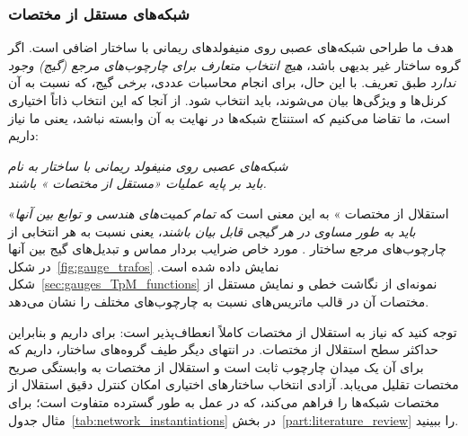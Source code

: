 

\subsubsection{شبکه‌های مستقل از مختصات }
هدف ما
طراحی شبکه‌های عصبی روی منیفولدهای ریمانی با ساختار اضافی  است.
اگر گروه ساختار  غیر بدیهی باشد، \emph{هیچ انتخاب متعارف برای چارچوب‌های مرجع (گیج) وجود ندارد} طبق تعریف.
با این حال، برای انجام محاسبات عددی، \emph{برخی} گیج، که نسبت به آن کرنل‌ها و ویژگی‌ها بیان می‌شوند، باید انتخاب شود.
از آنجا که این انتخاب ذاتاً اختیاری است، ما تقاضا می‌کنیم که استنتاج شبکه‌ها در نهایت به آن وابسته نباشد، یعنی ما نیاز داریم:
\begin{center}\it
	شبکه‌های عصبی روی منیفولد ریمانی با ساختار  به نام \lr{$\GM$} \\
	باید بر پایه عملیات «مستقل از مختصات \lr{$\GM$}» باشند.
\end{center}
«استقلال از مختصات \lr{$\GM$}» به این معنی است که \emph{تمام کمیت‌های هندسی و توابع بین آنها باید به طور مساوی در هر گیجی قابل بیان باشند}، یعنی نسبت به هر انتخابی از چارچوب‌های مرجع ساختار .
مورد خاص ضرایب بردار مماس و تبدیل‌های گیج بین آنها در شکل~\ref{fig:gauge_trafos} نمایش داده شده است.
شکل~\ref{sec:gauges_TpM_functions} نمونه‌ای از نگاشت خطی و نمایش مستقل از مختصات آن در قالب ماتریس‌های نسبت به چارچوب‌های مختلف را نشان می‌دهد.


توجه کنید که نیاز به استقلال از مختصات \lr{$\GM$} کاملاً انعطاف‌پذیر است:
برای  داریم \lr{$\GM=\FM$} و بنابراین حداکثر سطح استقلال از مختصات.
در انتهای دیگر طیف گروه‌های ساختار،  داریم که برای آن \lr{$\GM$} یک میدان چارچوب ثابت است و استقلال از مختصات \lr{$\GM$} به وابستگی صریح مختصات تقلیل می‌یابد.
آزادی انتخاب ساختارهای  اختیاری امکان کنترل دقیق استقلال از مختصات شبکه‌ها را فراهم می‌کند،
که در عمل به طور گسترده متفاوت است؛ برای مثال جدول~\ref{tab:network_instantiations} در بخش~\ref{part:literature_review} را ببینید.



